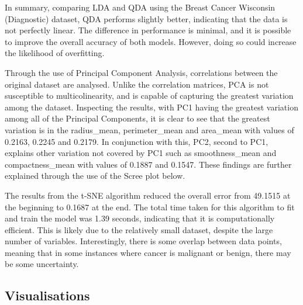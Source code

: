 \documentclass[
]{article}
\begin{document}
In summary, comparing LDA and QDA using the Breast Cancer Wisconsin
(Diagnostic) dataset, QDA performs slightly better, indicating that the
data is not perfectly linear. The difference in performance is minimal,
and it is possible to improve the overall accuracy of both models.
However, doing so could increase the likelihood of overfitting.

Through the use of Principal Component Analysis, correlations between
the original dataset are analysed. Unlike the correlation matrices, PCA
is not susceptible to multicolinearity, and is capable of capturing the
greatest variation among the dataset. Inspecting the results, with PC1
having the greatest variation among all of the Principal Components, it
is clear to see that the greatest variation is in the radius\_mean,
perimeter\_mean and area\_mean with values of 0.2163, 0.2245 and 0.2179.
In conjunction with this, PC2, second to PC1, explains other variation
not covered by PC1 such as smoothness\_mean and compactness\_mean with
values of 0.1887 and 0.1547. These findings are further explained
through the use of the Scree plot below.

The results from the t-SNE algorithm reduced the overall error from
49.1515 at the beginning to 0.1687 at the end. The total time taken for
this algorithm to fit and train the model was 1.39 seconds, indicating
that it is computationally efficient. This is likely due to the
relatively small dataset, despite the large number of variables.
Interestingly, there is some overlap between data points, meaning that
in some instances where cancer is malignant or benign, there may be some
uncertainty.

\subsection{Visualisations}\label{visualisations}
\end{document}
